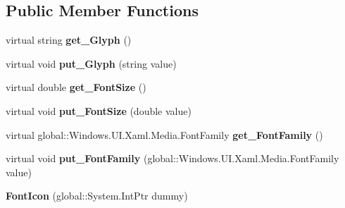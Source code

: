 \subsection*{Public Member Functions}
\begin{DoxyCompactItemize}
\item 
\mbox{\label{class_windows_1_1_u_i_1_1_xaml_1_1_controls_1_1_font_icon_a5eed21875f8e0fd909a420f8ddf1d1a9}} 
virtual string {\bfseries get\+\_\+\+Glyph} ()
\item 
\mbox{\label{class_windows_1_1_u_i_1_1_xaml_1_1_controls_1_1_font_icon_adce42635121ffcf86756f04dc4002c0c}} 
virtual void {\bfseries put\+\_\+\+Glyph} (string value)
\item 
\mbox{\label{class_windows_1_1_u_i_1_1_xaml_1_1_controls_1_1_font_icon_a56c9091282a44095056b589c9e417ec8}} 
virtual double {\bfseries get\+\_\+\+Font\+Size} ()
\item 
\mbox{\label{class_windows_1_1_u_i_1_1_xaml_1_1_controls_1_1_font_icon_ab6e9c5d300ab27fe473978c6792a49a5}} 
virtual void {\bfseries put\+\_\+\+Font\+Size} (double value)
\item 
\mbox{\label{class_windows_1_1_u_i_1_1_xaml_1_1_controls_1_1_font_icon_a1ec67522af9017e450d6266855bc81d5}} 
virtual global\+::\+Windows.\+U\+I.\+Xaml.\+Media.\+Font\+Family {\bfseries get\+\_\+\+Font\+Family} ()
\item 
\mbox{\label{class_windows_1_1_u_i_1_1_xaml_1_1_controls_1_1_font_icon_a1f39590903627ddd712e1b20dba0c7ff}} 
virtual void {\bfseries put\+\_\+\+Font\+Family} (global\+::\+Windows.\+U\+I.\+Xaml.\+Media.\+Font\+Family value)
\item 
\mbox{\label{class_windows_1_1_u_i_1_1_xaml_1_1_controls_1_1_font_icon_a8416249e681423ded4616ce07522b6aa}} 
{\bfseries Font\+Icon} (global\+::\+System.\+Int\+Ptr dummy)
\item 

\end{DoxyCompactItemize}
